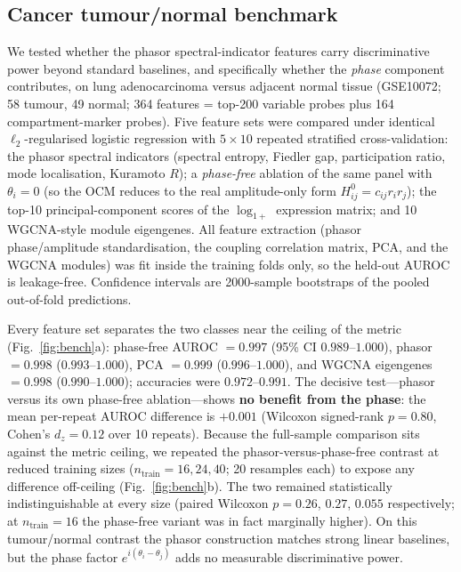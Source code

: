 \subsection{Cancer tumour/normal benchmark}
\label{sec:res-cancer-bench}

We tested whether the phasor spectral-indicator features carry discriminative
power beyond standard baselines, and specifically whether the \emph{phase}
component contributes, on lung adenocarcinoma versus adjacent normal tissue
(GSE10072; 58 tumour, 49 normal; 364 features = top-200 variable probes plus
164 compartment-marker probes). Five feature sets were compared under identical
$\ell_2$-regularised logistic regression with $5\times10$ repeated stratified
cross-validation: the phasor spectral indicators (spectral entropy, Fiedler
gap, participation ratio, mode localisation, Kuramoto $R$); a \emph{phase-free}
ablation of the same panel with $\theta_i\!=\!0$ (so the OCM reduces to the
real amplitude-only form $H^0_{ij}=c_{ij}r_ir_j$); the top-10 principal-component
scores of the $\log_{1+}$ expression matrix; and 10 WGCNA-style module
eigengenes. All feature extraction (phasor phase/amplitude standardisation,
the coupling correlation matrix, PCA, and the WGCNA modules) was fit inside the
training folds only, so the held-out AUROC is leakage-free. Confidence intervals
are 2000-sample bootstraps of the pooled out-of-fold predictions.

Every feature set separates the two classes near the ceiling of the metric
(Fig.~\ref{fig:bench}a): phase-free AUROC $=0.997$ (95\% CI $0.989$--$1.000$), phasor
$=0.998$ ($0.993$--$1.000$), PCA $=0.999$ ($0.996$--$1.000$), and WGCNA eigengenes $=0.998$
($0.990$--$1.000$); accuracies were $0.972$--$0.991$. The decisive test---phasor versus its
own phase-free ablation---shows \textbf{no benefit from the phase}: the mean
per-repeat AUROC difference is $+0.001$ (Wilcoxon signed-rank $p=0.80$, Cohen's
$d_z=0.12$ over 10 repeats). Because the full-sample comparison sits against the
metric ceiling, we repeated the phasor-versus-phase-free contrast at reduced
training sizes ($n_{\mathrm{train}}=16,24,40$; 20 resamples each) to expose any
difference off-ceiling (Fig.~\ref{fig:bench}b). The two remained statistically
indistinguishable at every size (paired Wilcoxon $p=0.26$, $0.27$, $0.055$
respectively; at $n_{\mathrm{train}}=16$ the phase-free variant was in fact
marginally higher). On this
tumour/normal contrast the phasor construction matches strong linear baselines,
but the phase factor $e^{i(\theta_i-\theta_j)}$ adds no measurable
discriminative power.

